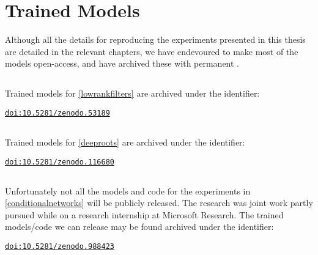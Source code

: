 \documentclass[thesis]{subfiles}
\begin{document}

\chapter{Trained Models}
\label{trainedmodels}
Although all the details for reproducing the experiments presented in this thesis are detailed in the relevant chapters, we have endevoured to make most of the models open-access, and have archived these with permanent .
\section*{}
Trained models for \cref{lowrankfilters} are archived under the identifier:
\begin{flushright}
    \href{https://doi.org/10.5281/zenodo.53189}{\texttt{doi:10.5281/zenodo.53189}}
\end{flushright}
\section*{}
Trained models for \cref{deeproots} are archived under the identifier:
\begin{flushright}
    \href{https://doi.org/10.5281/zenodo.116680}{\texttt{doi:10.5281/zenodo.116680}}
\end{flushright}
\section*{}
Unfortunately not all the models and code for the experiments in \cref{conditionalnetworks} will be publicly released. The research was joint work partly pursued while on a research internship at Microsoft Research. The trained models/code we can release may be found archived under the identifier:
\begin{flushright}
    \href{https://doi.org/10.5281/zenodo.988423}{\texttt{doi:10.5281/zenodo.988423}}
\end{flushright}
\end{document}
